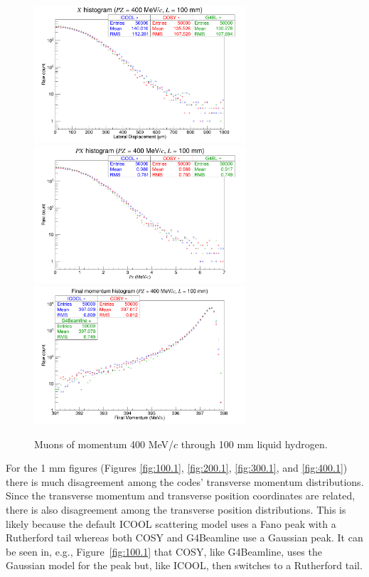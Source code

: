 \begin{figure}[H]
  \centering
    \includegraphics[width=0.7\textwidth]{Benchmarking/LH/X.400.100.png} 
    \includegraphics[width=0.7\textwidth]{Benchmarking/LH/PX.400.100.png} 
    \includegraphics[width=0.7\textwidth]{Benchmarking/LH/strag.400.100.png} 
  \caption{Muons of momentum 400 MeV/$c$ through 100 mm liquid hydrogen.}
  \label{fig:400.100}
\end{figure}


For the 1 mm figures (Figures \ref{fig:100.1}, \ref{fig:200.1}, \ref{fig:300.1}, and \ref{fig:400.1}) there is much disagreement among the codes' transverse momentum distributions. Since the transverse momentum and transverse position coordinates are related, there is also disagreement among the transverse position distributions. This is likely because the default ICOOL scattering model uses a Fano peak with a Rutherford tail whereas both COSY and G4Beamline use a Gaussian peak. It can be seen in, e.g., Figure~\ref{fig:100.1} that COSY, like G4Beamline, uses the Gaussian model for the peak but, like ICOOL, then switches to a Rutherford tail.

